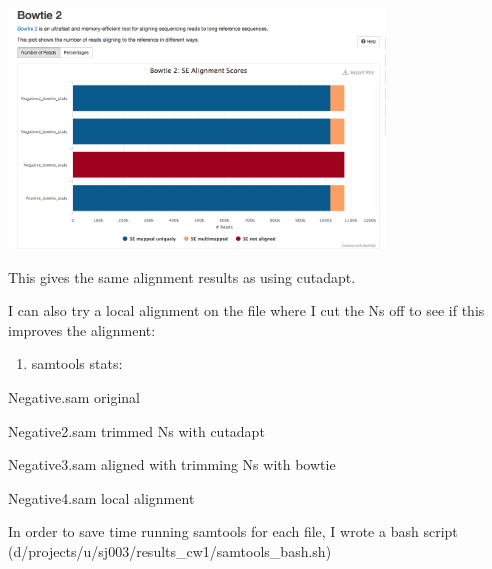 \documentclass[]{article}
\newenvironment{Shaded}{\begin{snugshade}}{\end{snugshade}}
\newcommand{\VariableTok}[1]{\textcolor[rgb]{0.00,0.00,0.00}{#1}}
\newcommand{\OperatorTok}[1]{\textcolor[rgb]{0.81,0.36,0.00}{\textbf{#1}}}
\newcommand{\BuiltInTok}[1]{#1}
\newcommand{\NormalTok}[1]{#1}
\providecommand{\tightlist}{%
  \setlength{\itemsep}{0pt}\setlength{\parskip}{0pt}}
\begin{document}
\includegraphics[width=0.75000\textwidth]{cw1_q1_multiqc.png}

This gives the same alignment results as using cutadapt.

I can also try a local alignment on the file where I cut the Ns off to
see if this improves the alignment:

\begin{Shaded}
\end{Shaded}

\begin{enumerate}
\def\labelenumi{\alph{enumi})}
\setcounter{enumi}{2}
\tightlist
\item
  samtools stats:
\end{enumerate}

Negative.sam original

Negative2.sam trimmed Ns with cutadapt

Negative3.sam aligned with trimming Ns with bowtie

Negative4.sam local alignment

In order to save time running samtools for each file, I wrote a bash
script (d/projects/u/sj003/results\_cw1/samtools\_bash.sh)
\end{document}
